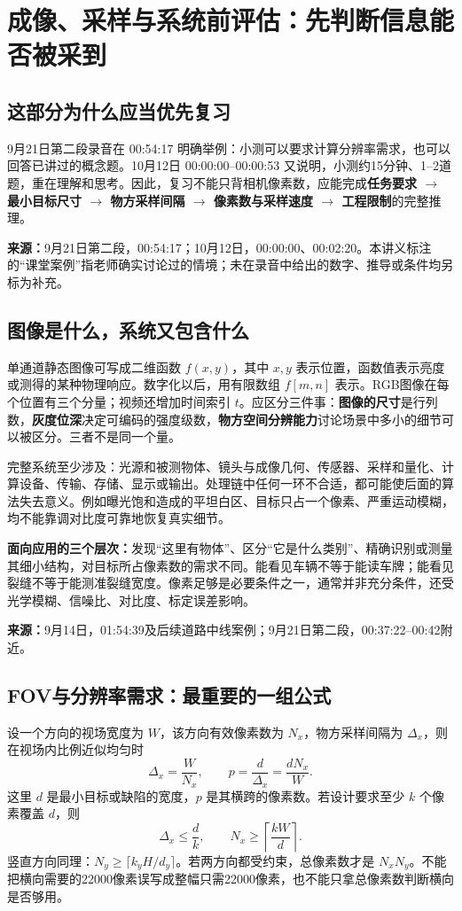 \section{成像、采样与系统前评估：先判断信息能否被采到}
\subsection{这部分为什么应当优先复习}
9月21日第二段录音在 00:54:17 明确举例：小测可以要求计算分辨率需求，也可以回答已讲过的概念题。10月12日 00:00:00--00:00:53 又说明，小测约15分钟、1--2道题，重在理解和思考。因此，复习不能只背相机像素数，应能完成\textbf{任务要求 $\rightarrow$ 最小目标尺寸 $\rightarrow$ 物方采样间隔 $\rightarrow$ 像素数与采样速度 $\rightarrow$ 工程限制}的完整推理。

\noindent\textbf{来源：}9月21日第二段，00:54:17；10月12日，00:00:00、00:02:20。本讲义标注的“课堂案例”指老师确实讨论过的情境；未在录音中给出的数字、推导或条件均另标为补充。

\subsection{图像是什么，系统又包含什么}
单通道静态图像可写成二维函数 $f(x,y)$，其中 $x,y$ 表示位置，函数值表示亮度或测得的某种物理响应。数字化以后，用有限数组 $f[m,n]$ 表示。RGB图像在每个位置有三个分量；视频还增加时间索引 $t$。应区分三件事：\textbf{图像的尺寸}是行列数，\textbf{灰度位深}决定可编码的强度级数，\textbf{物方空间分辨能力}讨论场景中多小的细节可以被区分。三者不是同一个量。

完整系统至少涉及：光源和被测物体、镜头与成像几何、传感器、采样和量化、计算设备、传输、存储、显示或输出。处理链中任何一环不合适，都可能使后面的算法失去意义。例如曝光饱和造成的平坦白区、目标只占一个像素、严重运动模糊，均不能靠调对比度可靠地恢复真实细节。

\textbf{面向应用的三个层次：}发现“这里有物体”、区分“它是什么类别”、精确识别或测量其细小结构，对目标所占像素数的需求不同。能看见车辆不等于能读车牌；能看见裂缝不等于能测准裂缝宽度。像素足够是必要条件之一，通常并非充分条件，还受光学模糊、信噪比、对比度、标定误差影响。

\noindent\textbf{来源：}9月14日，01:54:39及后续道路中线案例；9月21日第二段，00:37:22--00:42附近。

\subsection{FOV与分辨率需求：最重要的一组公式}
设一个方向的视场宽度为 $W$，该方向有效像素数为 $N_x$，物方采样间隔为 $\Delta_x$，则在视场内比例近似均匀时
\begin{equation}
\Delta_x=\frac{W}{N_x},\qquad p=\frac{d}{\Delta_x}=\frac{dN_x}{W}.
\end{equation}
这里 $d$ 是最小目标或缺陷的宽度，$p$ 是其横跨的像素数。若设计要求至少 $k$ 个像素覆盖 $d$，则
\begin{equation}
\boxed{\Delta_x\leq\frac{d}{k},\qquad N_x\geq\left\lceil\frac{kW}{d}\right\rceil .}
\end{equation}
竖直方向同理：$N_y\geq\lceil k_yH/d_y\rceil$。若两方向都受约束，总像素数才是 $N_xN_y$。不能把横向需要的22000像素误写成整幅只需22000像素，也不能只拿总像素数判断横向是否够用。

